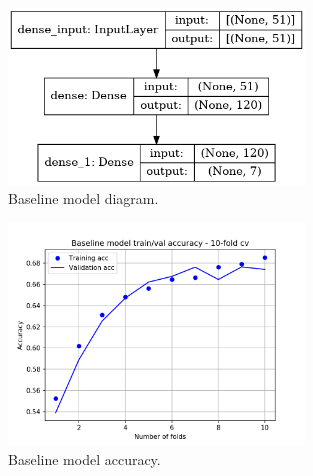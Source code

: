 \begin{figure}
\centering
\includegraphics[width=0.7\textwidth]{./TeX_files/img/baselinemodel.png}
\caption{Baseline model diagram.}
\label{fig:baselinemodel}
\end{figure}

\begin{figure}
\centering
\includegraphics[width=0.7\textwidth]{./TeX_files/img/baselinemodelacc.png}
\caption{Baseline model accuracy.}
\label{fig:baselinemodelacc}
\end{figure}

